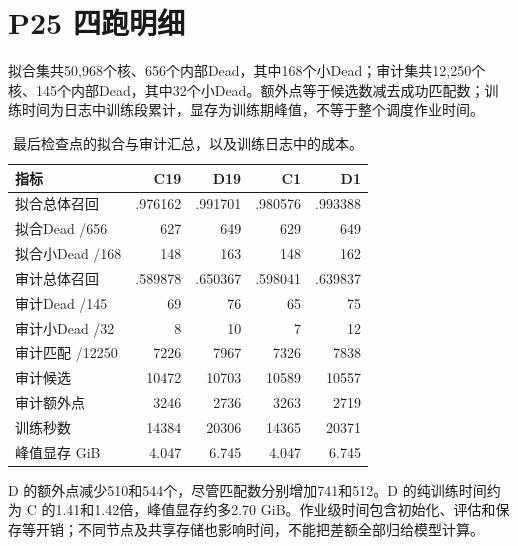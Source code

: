 \section{P25 四跑明细}
拟合集共50,968个核、656个内部Dead，其中168个小Dead；审计集共12,250个核、145个内部Dead，其中32个小Dead。额外点等于候选数减去成功匹配数；训练时间为日志中训练段累计，显存为训练期峰值，不等于整个调度作业时间。
\begin{table}[H]\centering\small\begin{tabular}{lrrrr}\toprule
指标 & C19 & D19 & C1 & D1\\\midrule
拟合总体召回 & .976162 & .991701 & .980576 & .993388\\
拟合Dead /656 & 627 & 649 & 629 & 649\\
拟合小Dead /168 & 148 & 163 & 148 & 162\\
审计总体召回 & .589878 & .650367 & .598041 & .639837\\
审计Dead /145 & 69 & 76 & 65 & 75\\
审计小Dead /32 & 8 & 10 & 7 & 12\\
审计匹配 /12250 & 7226 & 7967 & 7326 & 7838\\
审计候选 & 10472 & 10703 & 10589 & 10557\\
审计额外点 & 3246 & 2736 & 3263 & 2719\\
训练秒数 & 14384 & 20306 & 14365 & 20371\\
峰值显存 GiB & 4.047 & 6.745 & 4.047 & 6.745\\\bottomrule
\end{tabular}\caption{最后检查点的拟合与审计汇总，以及训练日志中的成本。}\end{table}
D 的额外点减少510和544个，尽管匹配数分别增加741和512。D 的纯训练时间约为 C 的1.41和1.42倍，峰值显存约多2.70 GiB。作业级时间包含初始化、评估和保存等开销；不同节点及共享存储也影响时间，不能把差额全部归给模型计算。

